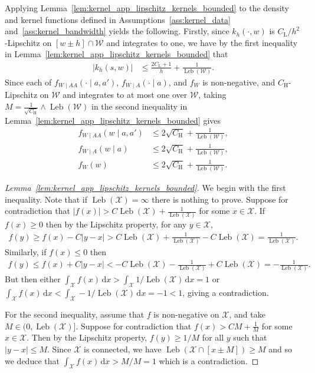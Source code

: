 \documentclass[11pt,lof]{puthesis}
\newcommand{\rH}{\ensuremath{\mathrm{H}}}
\newcommand{\rL}{\ensuremath{\mathrm{L}}}
\newcommand{\cX}{\ensuremath{\mathcal{X}}}
\newcommand{\cW}{\ensuremath{\mathcal{W}}}
\DeclareMathOperator{\Leb}{Leb}
\newcommand{\diff}[1]{\,\mathrm{d}#1}
\theoremstyle{break}
\theoremstyle{proof}
\newtheorem{proof}{Proof}
\begin{document}
Applying Lemma~\ref{lem:kernel_app_lipschitz_kernels_bounded}
to the density and kernel functions defined in
Assumptions~\ref{ass:kernel_data} and~\ref{ass:kernel_bandwidth}
yields the following.
Firstly, since $k_h(\cdot, w)$ is $C_\rL / h^2$-Lipschitz
on $[w \pm h] \cap \cW$ and integrates to one,
we have by the first inequality in
Lemma~\ref{lem:kernel_app_lipschitz_kernels_bounded} that
%
\begin{align*}
  |k_h(s,w)|
  &\leq \frac{2 C_\rL + 1}{h} + \frac{1}{\Leb(\cW)}.
\end{align*}
%
Since each of
$f_{W \mid AA}(\cdot \mid a,a')$,
$f_{W \mid A}(\cdot \mid a)$, and
$f_W$ is non-negative, and $C_\rH$-Lipschitz on $\cW$
and integrates to at most one over $\cW$,
taking $M = \frac{1}{\sqrt{C_\rH}} \wedge \Leb(\cW)$
in the second inequality in
Lemma~\ref{lem:kernel_app_lipschitz_kernels_bounded}
gives
%
\begin{align*}
  f_{W \mid AA}(w \mid a,a')
  &\leq 2 \sqrt{C_\rH} + \frac{1}{\Leb(\cW)}, \\
  f_{W \mid A}(w \mid a)
  &\leq 2 \sqrt{C_\rH} + \frac{1}{\Leb(\cW)}, \\
  f_W(w)
  &\leq 2 \sqrt{C_\rH} + \frac{1}{\Leb(\cW)}.
\end{align*}

\begin{proof}[Lemma~\ref{lem:kernel_app_lipschitz_kernels_bounded}]

  We begin with the first inequality.
  Note that if $\Leb(\cX) = \infty$ there is nothing to prove.
  Suppose for contradiction that
  $|f(x)| > C \Leb(\cX) + \frac{1}{\Leb(\cX)}$
  for some $x \in \cX$.
  If $f(x) \geq 0$
  then by the Lipschitz property, for any $y \in \cX$,
  \begin{align*}
    f(y)
    \geq f(x) - C|y-x|
    > C \Leb(\cX) + \frac{1}{\Leb(\cX)} - C\Leb(\cX)
    = \frac{1}{\Leb(\cX)}.
  \end{align*}
  Similarly, if $f(x) \leq 0$ then
  \begin{align*}
    f(y)
    \leq f(x) + C|y-x|
    < - C \Leb(\cX) - \frac{1}{\Leb(\cX)} + C\Leb(\cX)
    = -\frac{1}{\Leb(\cX)}.
  \end{align*}
  But then either
  $\int_\cX f(x) \diff{x} > \int_\cX 1/\Leb(\cX) \diff{x} = 1$
  or $\int_\cX f(x) \diff{x} < \int_\cX -1/\Leb(\cX) \diff{x} = -1 < 1$, giving
  a contradiction.

  For the second inequality,
  assume that $f$ is non-negative on $\cX$,
  and take $M \in \big(0, \Leb(\cX)\big]$.
  Suppose for contradiction that
  $f(x) > C M + \frac{1}{M}$
  for some $x \in \cX$.
  Then by the Lipschitz property, $f(y) \geq 1/M$
  for all $y$ such that $|y - x| \leq M$.
  Since $\cX$ is connected, we have
  $\Leb(\cX \cap [x \pm M]) \geq M$
  and so we deduce that
  $\int_\cX f(x) \diff{x} > M/M = 1$
  which is a contradiction.
\end{proof}
\end{document}
